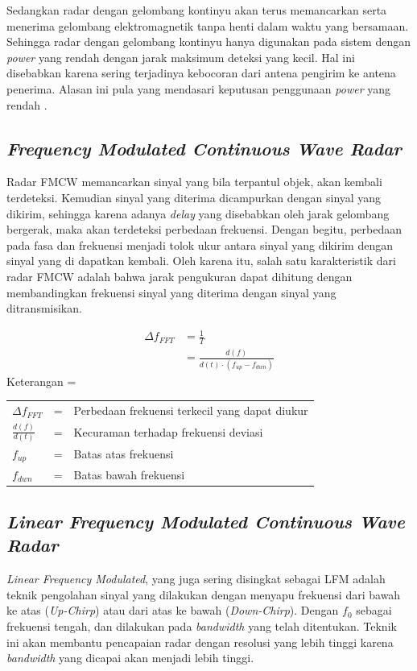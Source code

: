 Sedangkan radar dengan gelombang kontinyu akan terus memancarkan serta menerima gelombang elektromagnetik tanpa henti dalam waktu yang bersamaan. Sehingga radar dengan gelombang kontinyu hanya digunakan pada sistem dengan \textit{power} yang rendah dengan jarak maksimum deteksi yang kecil. Hal ini disebabkan karena sering terjadinya kebocoran dari antena pengirim ke antena penerima. Alasan ini pula yang mendasari keputusan penggunaan \textit{power} yang rendah \cite{Scheer2015}.

\subsection{\textit{Frequency Modulated Continuous Wave Radar}}

Radar FMCW memancarkan sinyal yang bila terpantul objek, akan kembali terdeteksi. Kemudian sinyal yang diterima dicampurkan dengan sinyal yang dikirim, sehingga karena adanya \textit{delay} yang disebabkan oleh jarak gelombang bergerak, maka akan terdeteksi perbedaan frekuensi. Dengan begitu, perbedaan pada fasa dan frekuensi menjadi tolok ukur antara sinyal yang dikirim dengan sinyal yang di dapatkan kembali.
Oleh karena itu, salah satu karakteristik dari radar FMCW adalah bahwa jarak pengukuran dapat dihitung dengan membandingkan frekuensi sinyal yang diterima dengan sinyal yang ditransmisikan.   


\begin{align} 
	\Delta f_{FFT} &= \frac{1}{T}\\ 
	&= \frac{d(f)}{d(t) \cdot (f_{up} - f_{dwn})}
\end{align}
Keterangan = \\
\begin{tabular} {l c l}
	$\Delta f_{FFT}$ 						& = & Perbedaan frekuensi terkecil yang dapat diukur \\
	$\frac{d(f)}{d(t)}$ 					& = & Kecuraman terhadap frekuensi deviasi\\
	$f_{up}$ 									& =	& Batas atas frekuensi\\
	$f_{dwn}$								& = & Batas bawah frekuensi\\
\end{tabular}

\subsection{\textit{Linear Frequency Modulated Continuous Wave Radar}}
\textit{Linear Frequency Modulated}, yang juga sering disingkat sebagai LFM adalah teknik pengolahan sinyal yang dilakukan dengan menyapu frekuensi dari bawah ke atas (\textit{Up-Chirp}) atau dari atas ke bawah (\textit{Down-Chirp}). Dengan $f_{0}$ sebagai frekuensi tengah, dan dilakukan pada \textit{bandwidth} yang telah ditentukan. Teknik ini akan membantu pencapaian radar dengan resolusi yang lebih tinggi karena \textit{bandwidth} yang dicapai akan menjadi lebih tinggi.


